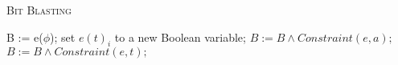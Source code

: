 \begin{algorithm}[]
 \caption{\textsc{Bit Blasting}}
  \label{alg:bitblast}
 \begin{algorithmic}[1]
   \State B := e($\phi$);
   \State set $e(t)_i$ to a new Boolean variable;
   \EndFor
   \EndFor
   \State $B:=B \land Constraint(e, a);$
   \EndFor
   \State $B:=B \land Constraint(e,t);$ 
   \EndFor
   \State {}
 \end{algorithmic}
\end{algorithm}  

